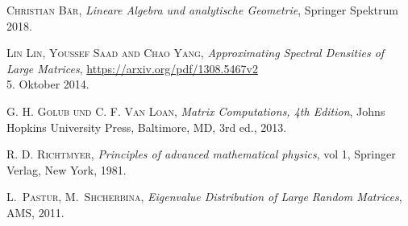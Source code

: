 
\begin{thebibliography}{56}

    \textsc{Christian Bär},
    \textit{Lineare Algebra und analytische Geometrie},
    Springer Spektrum
    2018.

    \textsc{Lin Lin, Youssef Saad and Chao Yang},
    \textit{Approximating Spectral Densities of Large Matrices},
    \url{https://arxiv.org/pdf/1308.5467v2}\\
    5. Oktober 2014.

    \textsc{G. H. Golub und C. F. Van Loan},
    \textit{Matrix Computations, 4th Edition},
    Johns Hopkins University Press,
    Baltimore, MD, 3rd ed.,
    2013.

    \textsc{R. D. Richtmyer},
    \textit{Principles of advanced mathematical physics},
    vol 1, Springer Verlag,
    New York,
    1981.

    \textsc{L.~Pastur, M.~Shcherbina},
    \textit{Eigenvalue Distribution of Large Random Matrices},
    AMS,
    2011.

\end{thebibliography}